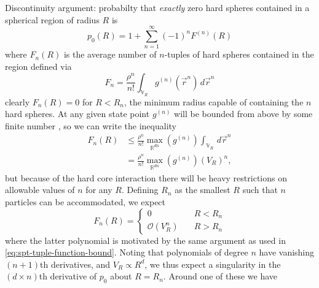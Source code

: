 \documentclass[12pt]{report}
\begin{document}
Discontinuity argument: probabilty that \emph{exactly} zero hard spheres contained in a spherical region of radius $R$ is \cite{Mandell1976}
\begin{equation}
  p_0(R) = 1 + \sum_{n=1}^{\infty} (-1)^n F^{(n)}(R)
\end{equation}
where $F_n(R)$ is the average number of $n$-tuples of hard spheres contained in the region defined via
\begin{equation}\label{eq:spt-tuple-function}
  F_n = \frac{\rho^n}{n!} \int_{\mathbb{V}_R} g^{(n)}(\vec{r}^n) \, d\vec{r}^n
\end{equation}
clearly $F_n(R) = 0$ for $R < R_n$, the minimum radius capable of containing the $n$ hard spheres.
At any given state point $g^{(n)}$ will be bounded from above by some finite number%
,
so we can write the inequality
\begin{equation}\label{eq:spt-tuple-function-bound}
  \begin{split}
    F_n(R) &\le
    \frac{\rho^n}{n!}
    \max_{\mathbb{R}^{dn}}{\left(g^{(n)}\right)}
    \int_{\mathbb{V}_R} \, d\vec{r}^n \\
    &=
    \frac{\rho^n}{n!}
    \max_{\mathbb{R}^{dn}}{\left(g^{(n)}\right)}
    (V_R)^n,
  \end{split}
\end{equation}
but because of the hard core interaction there will be heavy restrictions on allowable values of $n$ for any $R$.
Defining $R_n$ as the smallest $R$ such that $n$ particles can be accommodated, we expect
\begin{equation}
  F_n(R) =
  \begin{cases}
    0 & \quad R < R_n \\
    \mathcal{O}\left( V_R^n \right) & \quad R > R_n
  \end{cases}
\end{equation}
where the latter polynomial is motivated by the same argument as used in \eqref{eq:spt-tuple-function-bound}.
Noting that polynomials of degree $n$ have vanishing $(n+1)$th derivatives, and $V_R \propto R^d$, we thus expect a singularity in the $(d \times n)$th derivative of $p_0$ about $R=R_n$.
Around one of these we have 
\end{document}
